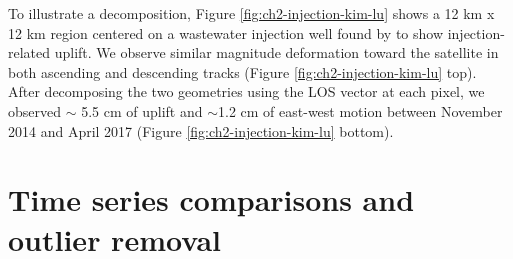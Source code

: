 To illustrate a decomposition, Figure \ref{fig:ch2-injection-kim-lu} shows a 12 km x 12 km region centered on a wastewater injection well found by \cite{Kim2018AssociationLocalizedGeohazards} to show injection-related uplift. We observe similar magnitude deformation toward the satellite in both ascending and descending tracks (Figure \ref{fig:ch2-injection-kim-lu} top). After decomposing the two geometries using the LOS vector at each pixel, we observed $\sim$ 5.5 cm of uplift and $\sim$1.2 cm of east-west motion between November 2014 and April 2017 (Figure \ref{fig:ch2-injection-kim-lu} bottom). 




%




\section{Time series comparisons and outlier removal}
\label{sec:ch4-ts-compare-result}

%





